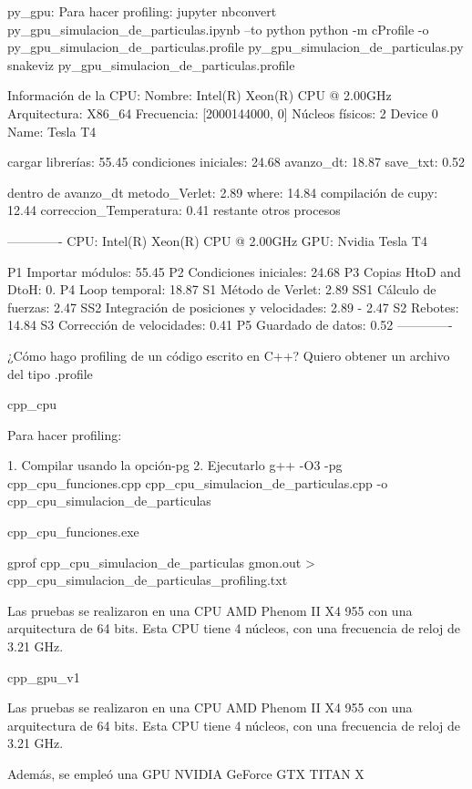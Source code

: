 \documentclass[aps,prb,twocolumn,superscriptaddress,floatfix,longbibliography]{revtex4-2}
\newcounter{para}
\begin{document}
\begin{itemize}
py_gpu:
Para hacer profiling:
jupyter nbconvert py_gpu_simulacion_de_particulas.ipynb --to python
python -m cProfile -o py_gpu_simulacion_de_particulas.profile py_gpu_simulacion_de_particulas.py
snakeviz py_gpu_simulacion_de_particulas.profile

Información de la CPU:
Nombre: Intel(R) Xeon(R) CPU @ 2.00GHz
Arquitectura: X86_64
Frecuencia: [2000144000, 0]
Núcleos físicos: 2
Device 0 Name: Tesla T4

cargar librerías: 55.45 %
condiciones iniciales: 24.68%
avanzo_dt: 18.87 %
save_txt: 0.52 %

dentro de avanzo_dt
metodo_Verlet: 2.89%
where: 14.84 %
compilación de cupy: 12.44 %
correccion_Temperatura: 0.41%
restante otros procesos


-------------
CPU: Intel(R) Xeon(R) CPU @ 2.00GHz
GPU: Nvidia Tesla T4

P1 Importar módulos: 55.45
P2 Condiciones iniciales: 24.68
P3 Copias HtoD and DtoH: 0.
P4 Loop temporal: 18.87
S1 Método de Verlet: 2.89
SS1 Cálculo de fuerzas: 2.47
SS2 Integración de posiciones y velocidades: 2.89 - 2.47
S2 Rebotes: 14.84
S3 Corrección de velocidades: 0.41
P5 Guardado de datos: 0.52
-------------

¿Cómo hago profiling de un código escrito en C++? Quiero obtener un archivo del tipo .profile



cpp_cpu

Para hacer profiling:

1. Compilar usando la opción-pg
2. Ejecutarlo
g++ -O3 -pg cpp_cpu_funciones.cpp cpp_cpu_simulacion_de_particulas.cpp -o cpp_cpu_simulacion_de_particulas

cpp_cpu_funciones.exe

gprof cpp_cpu_simulacion_de_particulas gmon.out > cpp_cpu_simulacion_de_particulas_profiling.txt


Las pruebas se realizaron en una CPU AMD Phenom II X4 955 con una arquitectura de 64 bits. Esta CPU tiene 4 núcleos, con una frecuencia de reloj de 3.21 GHz.


cpp_gpu_v1

Las pruebas se realizaron en una CPU AMD Phenom II X4 955 con una arquitectura de 64 bits. Esta CPU tiene 4 núcleos, con una frecuencia de reloj de 3.21 GHz.

Además, se empleó una GPU NVIDIA GeForce GTX TITAN X



\end{itemize}
\end{document}
